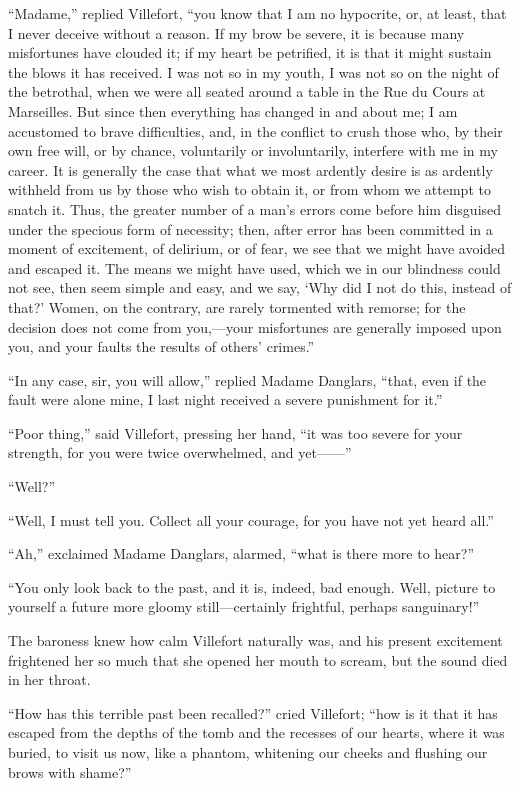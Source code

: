 “Madame,” replied Villefort, “you know that I am no hypocrite, or, at
least, that I never deceive without a reason. If my brow be severe, it
is because many misfortunes have clouded it; if my heart be petrified,
it is that it might sustain the blows it has received. I was not so in
my youth, I was not so on the night of the betrothal, when we were all
seated around a table in the Rue du Cours at Marseilles. But since then
everything has changed in and about me; I am accustomed to brave
difficulties, and, in the conflict to crush those who, by their own
free will, or by chance, voluntarily or involuntarily, interfere with
me in my career. It is generally the case that what we most ardently
desire is as ardently withheld from us by those who wish to obtain it,
or from whom we attempt to snatch it. Thus, the greater number of a
man’s errors come before him disguised under the specious form of
necessity; then, after error has been committed in a moment of
excitement, of delirium, or of fear, we see that we might have avoided
and escaped it. The means we might have used, which we in our blindness
could not see, then seem simple and easy, and we say, ‘Why did I not do
this, instead of that?’ Women, on the contrary, are rarely tormented
with remorse; for the decision does not come from you,—your misfortunes
are generally imposed upon you, and your faults the results of others’
crimes.”

“In any case, sir, you will allow,” replied Madame Danglars, “that,
even if the fault were alone mine, I last night received a severe
punishment for it.”

“Poor thing,” said Villefort, pressing her hand, “it was too severe for
your strength, for you were twice overwhelmed, and yet——”

“Well?”

“Well, I must tell you. Collect all your courage, for you have not yet
heard all.”

“Ah,” exclaimed Madame Danglars, alarmed, “what is there more to hear?”

“You only look back to the past, and it is, indeed, bad enough. Well,
picture to yourself a future more gloomy still—certainly frightful,
perhaps sanguinary!”

The baroness knew how calm Villefort naturally was, and his present
excitement frightened her so much that she opened her mouth to scream,
but the sound died in her throat.

“How has this terrible past been recalled?” cried Villefort; “how is it
that it has escaped from the depths of the tomb and the recesses of our
hearts, where it was buried, to visit us now, like a phantom, whitening
our cheeks and flushing our brows with shame?”

